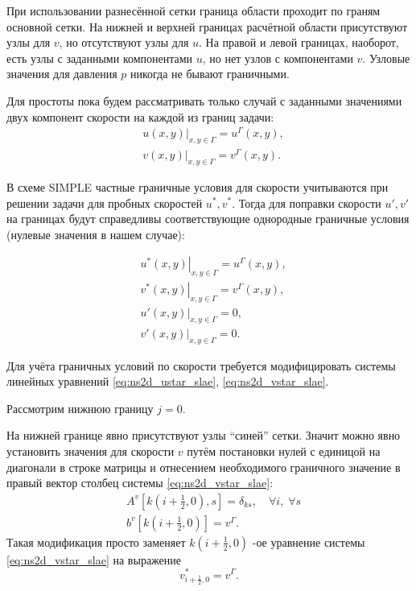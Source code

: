 При использовании разнесённой сетки граница области проходит
по граням основной сетки. 
На нижней и верхней границах расчётной области
присутствуют узлы для $v$, но отсутствуют
узлы для $u$.
На правой и левой границах, наоборот,
есть узлы с заданными компонентами $u$,
но нет узлов с компонентами $v$.
Узловые значения для давления $p$
никогда не бывают граничными.

Для простоты пока будем рассматривать только случай с заданными значениями
двух компонент скорости на каждой из границ задачи:
\begin{align*}
    &\left. u(x, y) \right|_{x,y\in\Gamma} = u^\Gamma(x, y), \\
    &\left. v(x, y) \right|_{x,y\in\Gamma} = v^\Gamma(x, y).
\end{align*}

В схеме SIMPLE частные граничные условия 
для скорости учитываются при решении задачи
для пробных скоростей $u^*, v^*$.
Тогда для поправки скорости $u', v'$ на границах
будут справедливы соответствующие однородные граничные условия (нулевые значения в нашем случае):

\begin{align}
    \label{eq:ns2d_usplit_bc}
    &\left. u^*(x, y) \right|_{x,y\in\Gamma} = u^\Gamma(x, y), \\
    \nonumber
    &\left. v^*(x, y) \right|_{x,y\in\Gamma} = v^\Gamma(x, y), \\
    \nonumber
    &\left. u'(x, y) \right|_{x,y\in\Gamma} = 0,\\
    \nonumber
    &\left. v'(x, y) \right|_{x,y\in\Gamma} = 0.
\end{align}

Для учёта граничных условий по скорости требуется модифицировать
системы линейных уравнений \eqref{eq:ns2d_ustar_slae}, \eqref{eq:ns2d_vstar_slae}.

Рассмотрим нижнюю границу $j=0$.

На нижней границе явно присутствуют узлы ``синей'' сетки.
Значит можно явно установить значения для скорости $v$
путём постановки нулей с единицой на диагонали в строке матрицы и отнесением необходимого
граничного значение в правый вектор столбец системы \eqref{eq:ns2d_vstar_slae}:
\begin{align}
    \label{eq:ns2d_bc1}
    &A^v[k(i+\tfrac12, 0), s] = \delta_{ks}, \quad \forall i, \; \forall s\\[10pt]
    \nonumber
    &b^{v}[k(i+\tfrac12, 0)] = v^\Gamma.
\end{align}
Такая модификация просто заменяет $k(i+\tfrac12, 0)$ -ое уравнение
системы \eqref{eq:ns2d_vstar_slae} на выражение
\begin{equation*}
    v^*_{i+\tfrac12, 0} = v^\Gamma.
\end{equation*}

